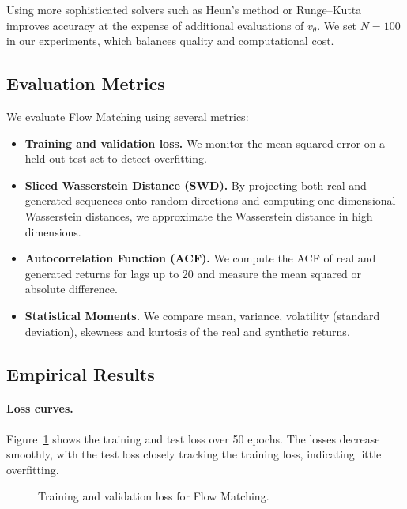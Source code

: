 Using more sophisticated solvers such as Heun's method or Runge–Kutta
improves accuracy at the expense of additional evaluations of
$v_\theta$.  We set $N=100$ in our experiments, which balances
quality and computational cost.

\subsection{Evaluation Metrics}

We evaluate Flow Matching using several metrics:
\begin{itemize}
  \item \textbf{Training and validation loss.}  We monitor the mean
    squared error on a held-out test set to detect overfitting.
  \item \textbf{Sliced Wasserstein Distance (SWD).}  By projecting
    both real and generated sequences onto random directions and
    computing one-dimensional Wasserstein distances, we approximate
    the Wasserstein distance in high dimensions.
  \item \textbf{Autocorrelation Function (ACF).}  We compute the ACF of
    real and generated returns for lags up to 20 and measure the mean
    squared or absolute difference.
  \item \textbf{Statistical Moments.}  We compare mean, variance,
    volatility (standard deviation), skewness and kurtosis of the real
    and synthetic returns.
\end{itemize}

\subsection{Empirical Results}

\paragraph{Loss curves.}  Figure~\ref{fig:fm_losses} shows the
training and test loss over 50 epochs.  The losses decrease smoothly,
with the test loss closely tracking the training loss, indicating
little overfitting.

\begin{figure}[H]
  \centering
  \caption{Training and validation loss for Flow Matching.}
  \label{fig:fm_losses}
\end{figure}

